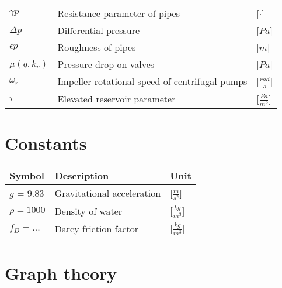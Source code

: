 \begin{tabular}{l l l}
	$\gamma p$			&	Resistance parameter of pipes 						& \hspace{25mm}[$\cdot$]\\	
	$\Delta p$			&	Differential pressure 						    	& \hspace{25mm}[$Pa$]\\
	$\epsilon p$		&	Roughness of pipes 						    		& \hspace{25mm}[$m$]\\	
	$\mu(q,k_v)$		&	Pressure drop on valves 						   	& \hspace{25mm}[$Pa$]\\
	$\omega_r$			&	Impeller rotational speed of centrifugal pumps 		& \hspace{25mm}[$\frac{rad}{s}$]\\
	$\tau$				&	Elevated reservoir parameter 			 			& \hspace{25mm}[$\frac{Pa}{m^3}$]\\	
\end{tabular}

\section*{Constants}

\begin{tabular}{l l l} 
	\textbf{Symbol}		&	\textbf{Description}							& \hspace{64mm}\textbf{Unit}			\\\hline						
	$g$ = 9.83 			&	Gravitational acceleration						& \hspace{64mm}[$\frac{m}{s^2}$]\\
	$\rho = 1000$		&	Density of water								& \hspace{64mm}[$\frac{kg}{m^3}$]\\
	$f_D = ...$			&	Darcy friction factor							& \hspace{64mm}[$\frac{kg}{m^3}$]\\
\end{tabular}

\section*{Graph theory}

